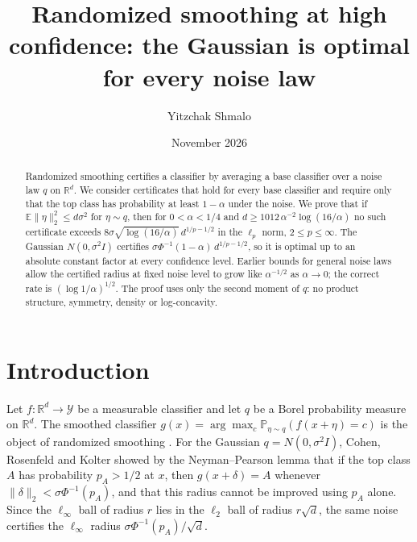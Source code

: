 \documentclass[11pt]{amsart}
\title[Randomized smoothing at high confidence]{Randomized smoothing at high confidence: the Gaussian is optimal for every noise law}
\author{Yitzchak Shmalo}
\date{November 2026}
\theoremstyle{definition}
\theoremstyle{remark}
\newcommand{\E}{\mathbb{E}}
\newcommand{\PP}{\mathbb{P}}
\newcommand{\R}{\mathbb{R}}
\begin{document}
\begin{abstract}
Randomized smoothing certifies a classifier by averaging a base classifier over a noise law $q$ on $\R^d$. We
consider certificates that hold for every base classifier and require only that the top class has probability
at least $1-\alpha$ under the noise. We prove that if $\E\|\eta\|_2^2\le d\sigma^2$ for $\eta\sim q$, then for
$0<\alpha<1/4$ and $d\ge 1012\,\alpha^{-2}\log(16/\alpha)$ no such certificate exceeds
$8\sigma\sqrt{\log(16/\alpha)}\,d^{1/p-1/2}$ in the $\ell_p$ norm, $2\le p\le\infty$. The Gaussian
$N(0,\sigma^2 I)$ certifies $\sigma\Phi^{-1}(1-\alpha)\,d^{1/p-1/2}$, so it is optimal up to an absolute
constant factor at every confidence level. Earlier bounds for general noise laws allow the certified radius at
fixed noise level to grow like $\alpha^{-1/2}$ as $\alpha\to0$; the correct rate is $(\log 1/\alpha)^{1/2}$.
The proof uses only the second moment of $q$: no product structure, symmetry, density or log-concavity.
\end{abstract}

\maketitle

\section{Introduction}

Let $f\colon\R^d\to\mathcal{Y}$ be a measurable classifier and let $q$ be a Borel probability measure on
$\R^d$. The smoothed classifier $g(x)=\arg\max_{c}\PP_{\eta\sim q}(f(x+\eta)=c)$ is the object of
randomized smoothing \cite{LAG19,LCWC19,CRK19}. For the Gaussian $q=N(0,\sigma^2I)$, Cohen, Rosenfeld and
Kolter \cite{CRK19} showed by the Neyman--Pearson lemma that if the top class $A$ has probability $p_A>1/2$
at $x$, then $g(x+\delta)=A$ whenever $\|\delta\|_2<\sigma\Phi^{-1}(p_A)$, and that this radius cannot be
improved using $p_A$ alone. Since the $\ell_\infty$ ball of radius $r$ lies in the $\ell_2$ ball of radius
$r\sqrt d$, the same noise certifies the $\ell_\infty$ radius $\sigma\Phi^{-1}(p_A)/\sqrt d$.
\end{document}
